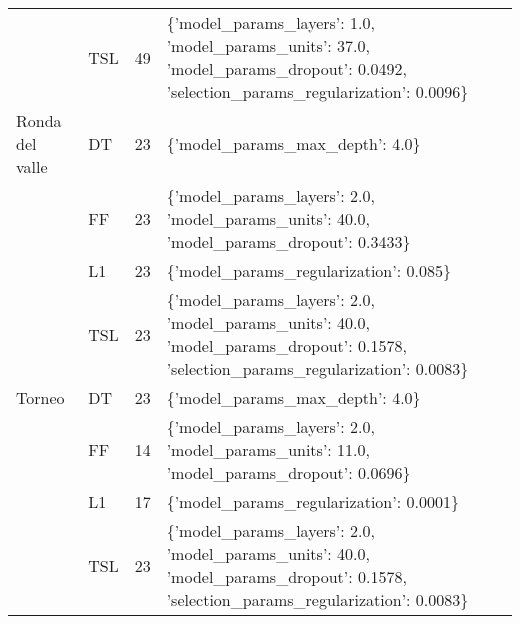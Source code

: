 \begin{tabular}{llrl}
       & TSL &      49 &  \{'model\_params\_layers': 1.0, 'model\_params\_units': 37.0, 'model\_params\_dropout': 0.0492, 'selection\_params\_regularization': 0.0096\} \\
Ronda del valle & DT &      23 &                                                                                                      \{'model\_params\_max\_depth': 4.0\} \\
       & FF &      23 &                                             \{'model\_params\_layers': 2.0, 'model\_params\_units': 40.0, 'model\_params\_dropout': 0.3433\} \\
       & L1 &      23 &                                                                                               \{'model\_params\_regularization': 0.085\} \\
       & TSL &      23 &  \{'model\_params\_layers': 2.0, 'model\_params\_units': 40.0, 'model\_params\_dropout': 0.1578, 'selection\_params\_regularization': 0.0083\} \\
Torneo & DT &      23 &                                                                                                      \{'model\_params\_max\_depth': 4.0\} \\
       & FF &      14 &                                             \{'model\_params\_layers': 2.0, 'model\_params\_units': 11.0, 'model\_params\_dropout': 0.0696\} \\
       & L1 &      17 &                                                                                              \{'model\_params\_regularization': 0.0001\} \\
       & TSL &      23 &  \{'model\_params\_layers': 2.0, 'model\_params\_units': 40.0, 'model\_params\_dropout': 0.1578, 'selection\_params\_regularization': 0.0083\} \\
\bottomrule
\end{tabular}
